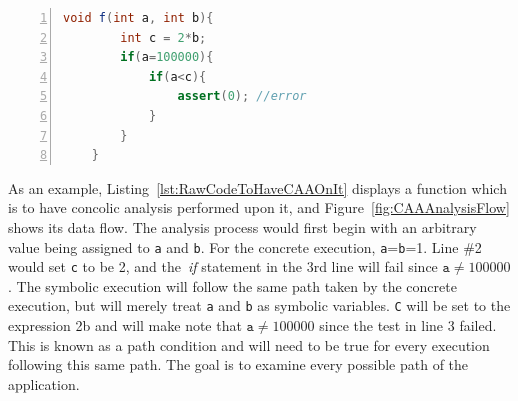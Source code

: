 \documentclass{sig-alternate-05-2015}
\begin{document}




\begin{lstlisting}[label=lst:RawCodeToHaveCAAOnIt, caption=Code to be examined by Concolic Analysis, language=Java, numbers=left]
	void f(int a, int b){
		int c = 2*b;
		if(a=100000){
			if(a<c){
				assert(0); //error
			}
		}
	}
\end{lstlisting}



As an example, Listing~\ref{lst:RawCodeToHaveCAAOnIt} displays a function which is to have concolic analysis performed upon it, and Figure~\ref{fig:CAAAnalysisFlow} shows its data flow. The analysis process would first begin with an arbitrary value being assigned to \texttt{a} and \texttt{b}. For the concrete execution, \texttt{a}=\texttt{b}=1. Line \#2 would set \texttt{c} to be 2, and the~\emph{if} statement in the 3rd line will fail since $ \texttt{a} \neq 100000$. The symbolic execution will follow the same path taken by the concrete execution, but will merely treat \texttt{a} and \texttt{b} as symbolic variables. \texttt{C} will be set to the expression 2b and will make note that $ \texttt{a} \neq 100000$ since the test in line 3 failed. This is known as a path condition and will need to be true for every execution following this same path. The goal is to examine every possible path of the application.

\end{document}
